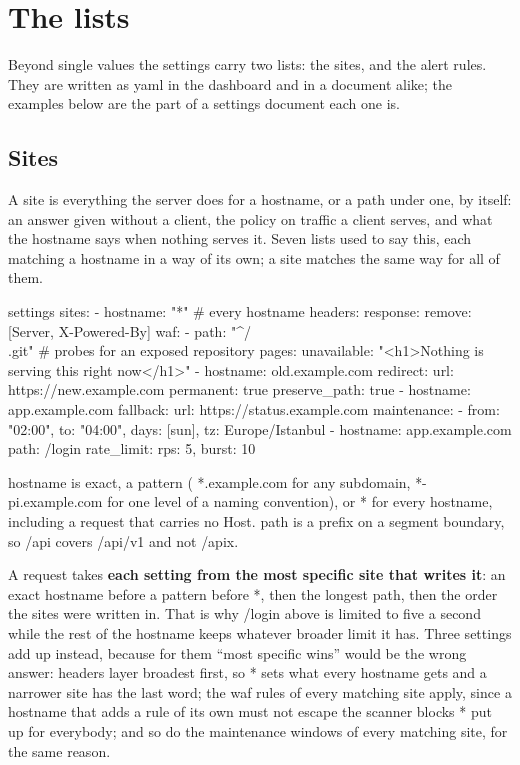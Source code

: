 \documentclass[11pt,a4paper,oneside]{book}
\newcommand{\aperiobreakableunderscore}{\textunderscore\allowbreak}
\newcommand{\aperiocodebreaks}{\XeTeXinterchartokenstate=1 }
\newcommand{\aperiocodebreaks}{}
\DeclareRobustCommand{\code}[1]{{\ttfamily\small\aperiocodebreaks
  \let\_\aperiobreakableunderscore#1}}
\begin{document}
\section{The lists}

Beyond single values the settings carry two lists: the sites, and the alert
rules. They are written as yaml in the dashboard and in a document alike; the
examples below are the part of a settings document each one is.

\subsection{Sites}
\label{sec:sites}

A site is everything the server does for a hostname, or a path under one, by
itself: an answer given without a client, the policy on traffic a client
serves, and what the hostname says when nothing serves it. Seven lists used
to say this, each matching a hostname in a way of its own; a site matches
the same way for all of them.

\begin{codecard}[aperioyaml]{settings}
sites:
  - hostname: "*"                     # every hostname
    headers:
      response:
        remove: [Server, X-Powered-By]
    waf:
      - path: "^/\\.git"              # probes for an exposed repository
    pages:
      unavailable: "<h1>Nothing is serving this right now</h1>"
  - hostname: old.example.com
    redirect:
      url: https://new.example.com
      permanent: true
      preserve_path: true
  - hostname: app.example.com
    fallback:
      url: https://status.example.com
    maintenance:
      - {from: "02:00", to: "04:00", days: [sun], tz: Europe/Istanbul}
  - hostname: app.example.com
    path: /login
    rate_limit: {rps: 5, burst: 10}
\end{codecard}

\code{hostname} is exact, a pattern (\code{*.example.com} for any subdomain,
\code{*-pi.example.com} for one level of a naming convention), or \code{*}
for every hostname, including a request that carries no \code{Host}.
\code{path} is a prefix on a segment boundary, so \code{/api} covers
\code{/api/v1} and not \code{/apix}.

A request takes \textbf{each setting from the most specific site that writes
it}: an exact hostname before a pattern before \code{*}, then the longest
\code{path}, then the order the sites were written in. That is why
\code{/login} above is limited to five a second while the rest of the
hostname keeps whatever broader limit it has. Three settings add up instead,
because for them ``most specific wins'' would be the wrong answer:
\code{headers} layer broadest first, so \code{*} sets what every hostname
gets and a narrower site has the last word; the \code{waf} rules of every
matching site apply, since a hostname that adds a rule of its own must not
escape the scanner blocks \code{*} put up for everybody; and so do the
\code{maintenance} windows of every matching site, for the same reason.
\end{document}
